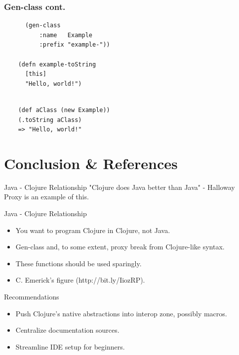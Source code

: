 \documentclass[xcolor=dvipsnames]{beamer}
\begin{document}
	\begin{frame}[fragile]
	\frametitle{Gen-class cont.}
		\begin{verbatim}
	  (gen-class
	      :name   Example 
	      :prefix "example-"))
	  
	(defn example-toString
	  [this]
	  "Hello, world!")
	  
	\end{verbatim}
	\pause
	\begin{verbatim}
	(def aClass (new Example))
	(.toString aClass)
	=> "Hello, world!"
	\end{verbatim}
	\end{frame}
	
	
	\section{Conclusion \& References}
	\begin{frame}{Java - Clojure Relationship}
	"Clojure does Java better than Java" - Halloway
	\linebreak
	Proxy is an example of this.
	\end{frame}
	
	\begin{frame}{Java - Clojure Relationship}
	\begin{itemize}	
	\item You want to program Clojure in Clojure, not Java.
	\item Gen-class and, to some extent, proxy break from Clojure-like syntax.
	\item These functions should be used sparingly.
	\item C. Emerick's figure (http://bit.ly/IiozRP).
	\end{itemize}
	\end{frame}
	
	\begin{frame}{Recommendations}
	\begin{itemize}
		\item Push Clojure's native abstractions into interop zone, possibly macros.
		\item Centralize documentation sources.
		\item Streamline IDE setup for beginners.
	\end{itemize}
	\end{frame}
	
\end{document}
